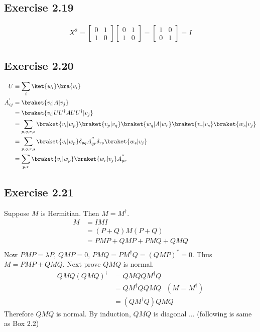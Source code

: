 \documentclass[a4paper,12pt]{article}
\begin{document}
\subsection*{Exercise 2.19}
\begin{align*}
	X^2 = \begin{bmatrix}
		0 & 1 \\
		1 & 0
	\end{bmatrix}
	\begin{bmatrix}
		0 & 1 \\
		1 & 0
	\end{bmatrix}
	= \begin{bmatrix}
		1 & 0 \\
		0 & 1
	\end{bmatrix} = I
\end{align*}



\subsection*{Exercise 2.20}
\begin{align*}
	U &\equiv \sum_i \ket{w_i}\bra{v_i}\\
	A_{ij}^{'} &= \braket{v_i | A | v_j}\\
	&= \braket{v_i | UU^\dagger A UU^\dagger | v_j}\\
	&= \sum_{p,q,r,s} \braket{v_i | w_p} \braket{v_p | v_q} \braket{w_q | A | w_r} \braket{v_r | v_s} \braket{w_s | v_j}\\
	&= \sum_{p,q,r,s} \braket{v_i | w_p} \delta_{pq} A_{qr}^{''} \delta_{rs}  \braket{w_s | v_j}\\
	&= \sum_{p,r}  \braket{v_i | w_p}  \braket{w_r | v_j} A_{pr}^{''}
\end{align*}


\subsection*{Exercise 2.21}
Suppose $M$ is Hermitian. Then $M = M^\dagger$.
\begin{align*}
	M &= IMI\\
		&= (P+Q) M (P+Q)\\
		&= PMP + QMP + PMQ + QMQ\\
\end{align*}
Now $PMP = \lambda P$, $QMP = 0$, $PMQ = PM^\dagger Q = (QMP)^* = 0$.
Thus $M = PMP + QMQ$.
Next prove $QMQ$ is normal.
\begin{align*}
	QMQ (QMQ)^\dagger &= QMQ QM^\dagger Q\\
		&= QM^\dagger Q QMQ ~~~ (M = M^\dagger)\\
		&= (QM^\dagger Q) QMQ
\end{align*}
Therefore $QMQ$ is normal.
By induction, $QMQ$ is diagonal ... (following is same as Box 2.2)
\end{document}
